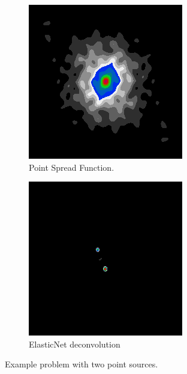 \begin{figure}[h]
\begin{subfigure}[b]{0.3\linewidth}
		\includegraphics[width=\linewidth]{./chapters/03.distribution/simulated/psf.png}
		\caption{Point Spread Function.}
		\label{cd:efficient:aid:psf}
	\end{subfigure}
	\begin{subfigure}[b]{0.3\linewidth}
		\includegraphics[width=\linewidth]{./chapters/03.distribution/simulated/elastic.png}
		\caption{ElasticNet deconvolution}
		\label{cd:efficient:aid:elastic}
	\end{subfigure}
	
	\caption{Example problem with two point sources.}
	\label{cd:efficient:aid:figure}
\end{figure}

